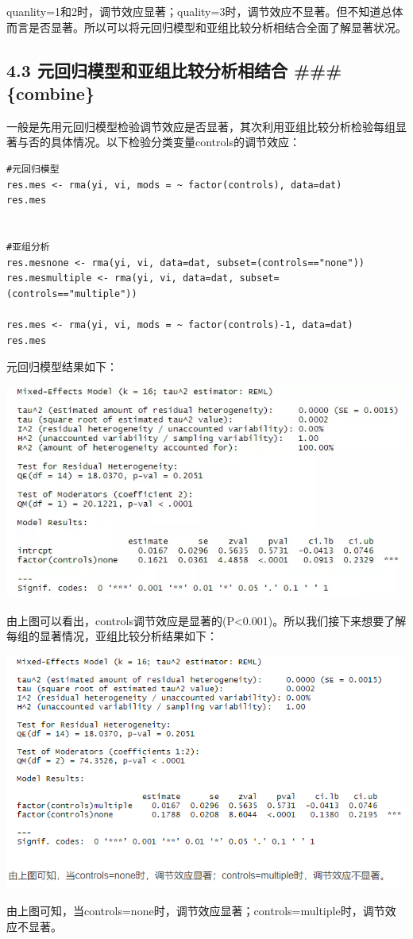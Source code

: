 \documentclass[
]{book}
\begin{document}
quanlity=1和2时，调节效应显著；quality=3时，调节效应不显著。但不知道总体而言是否显著。所以可以将元回归模型和亚组比较分析相结合全面了解显著状况。

\hypertarget{ux5143ux56deux5f52ux6a21ux578bux548cux4e9aux7ec4ux6bd4ux8f83ux5206ux6790ux76f8ux7ed3ux5408-combine}{%
\subsection{4.3 元回归模型和亚组比较分析相结合 \#\#\# \{combine\}}\label{ux5143ux56deux5f52ux6a21ux578bux548cux4e9aux7ec4ux6bd4ux8f83ux5206ux6790ux76f8ux7ed3ux5408-combine}}

一般是先用元回归模型检验调节效应是否显著，其次利用亚组比较分析检验每组显著与否的具体情况。以下检验分类变量controls的调节效应：

\begin{verbatim}
#元回归模型
res.mes <- rma(yi, vi, mods = ~ factor(controls), data=dat) 
res.mes 


#亚组分析
res.mesnone <- rma(yi, vi, data=dat, subset=(controls=="none")) 
res.mesmultiple <- rma(yi, vi, data=dat, subset=(controls=="multiple")) 

res.mes <- rma(yi, vi, mods = ~ factor(controls)-1, data=dat) 
res.mes 
\end{verbatim}

元回归模型结果如下：

\includegraphics{figs/3243.png}

由上图可以看出，controls调节效应是显著的(P\textless0.001)。所以我们接下来想要了解每组的显著情况，亚组比较分析结果如下：

\includegraphics{figs/3244.png}

由上图可知，当controls=none时，调节效应显著；controls=multiple时，调节效应不显著。

\printbibliography
\end{document}
